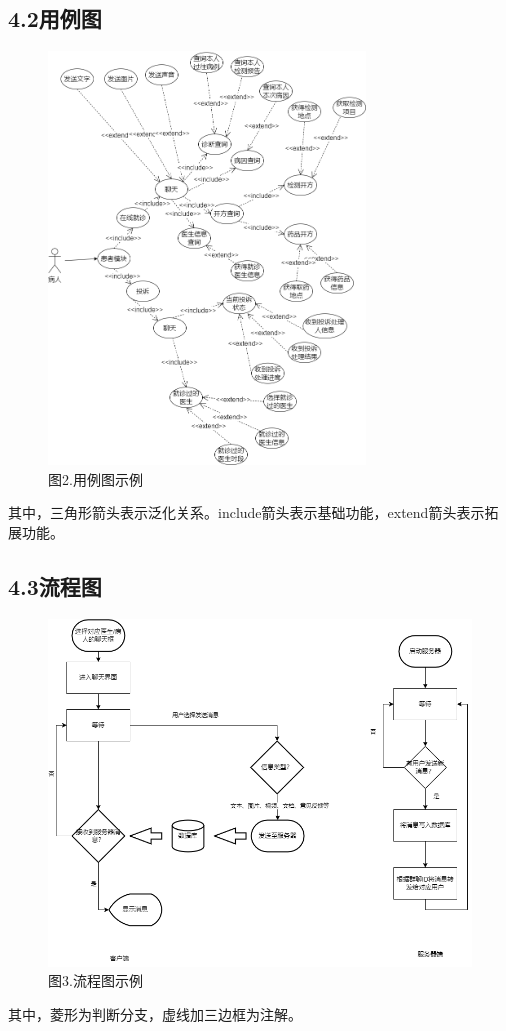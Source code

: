 \documentclass[24pt,a4paper]{article}%
\begin{document}
\subsection*{\songti 4.2用例图}
\begin{figure}[H]
    \centering
    \includegraphics[width=0.75\textwidth]{images/example.png}
    \caption*{图2.用例图示例}
\end{figure}
其中，三角形箭头表示泛化关系。include箭头表示基础功能，extend箭头表示拓展功能。
\subsection*{\songti 4.3流程图}
\begin{figure}[H]
    \centering
    \includegraphics[width=1\textwidth]{images/pipeline.png}
    \caption*{图3.流程图示例}
\end{figure}
其中，菱形为判断分支，虚线加三边框为注解。
\end{document}

